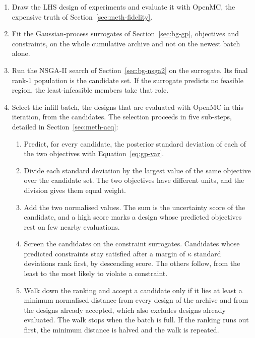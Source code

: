 \begin{enumerate}
  \item Draw the LHS design of experiments and evaluate it with OpenMC,
        the expensive truth of Section~\ref{sec:meth-fidelity}.

  \item Fit the Gaussian-process surrogates of
        Section~\ref{sec:bg-gp}, objectives and constraints, on the
        whole cumulative archive and not on the newest batch alone.

  \item Run the NSGA-II search of Section~\ref{sec:bg-nsga2} on the
        surrogate. Its final rank-1 population is the candidate set.
        If the surrogate predicts no feasible region, the
        least-infeasible members take that role.

  \item Select the infill batch, the designs that are evaluated with
        OpenMC in this iteration, from the candidates. The selection
        proceeds in five sub-steps, detailed in
        Section~\ref{sec:meth-acq}:
        \begin{enumerate}[label=\arabic{enumi}.\arabic*]
          \item Predict, for every candidate, the posterior standard
                deviation of each of the two objectives with
                Equation~\eqref{eq:gp-var}.

          \item Divide each standard deviation by the largest value of
                the same objective over the candidate set. The two
                objectives have different units, and the division gives
                them equal weight.

          \item Add the two normalised values. The sum is the
                uncertainty score of the candidate, and a high score
                marks a design whose predicted objectives rest on few
                nearby evaluations.

          \item Screen the candidates on the constraint surrogates.
                Candidates whose predicted constraints stay satisfied
                after a margin of $\kappa$ standard deviations rank first,
                by descending score. The others follow, from the least to
                the most likely to violate a constraint.

          \item Walk down the ranking and accept a candidate only if it
                lies at least a minimum normalised distance from every
                design of the archive and from the designs already
                accepted, which also excludes designs already evaluated.
                The walk stops when the batch is full. If the ranking runs
                out first, the minimum distance is halved and the walk is
                repeated.
        \end{enumerate}


\end{enumerate}
